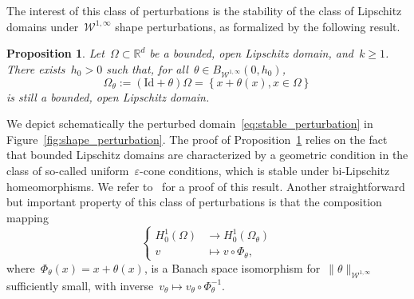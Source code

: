 \documentclass[a4]{article}
\newcommand{\R}{\mathbb{R}}
\newcommand{\1}{\mathbbm 1}
\newcommand{\Winf}{{{\cW}^{1,\infty}}}
\newcommand{\Id}{\mathrm{Id}}
\newcommand{\cW}{\mathcal{W}}
\newtheorem{proposition}{Proposition}
\begin{document}
        The interest of this class of perturbations is the stability of the class of Lipschitz domains under~$\Winf$ shape perturbations, as formalized by the following result.
        \begin{proposition}
            \label{prop:domain_stability}
            Let~$\Omega\subset \R^d$ be a bounded, open Lipschitz domain, and~$k\geq 1$. There exists~$h_0>0$ such that, for all~$\theta\in B_{\Winf}(0,h_0)$,
            \begin{equation}
                \label{eq:stable_perturbation}
                \Omega_\theta := (\Id+\theta)\Omega = \left\{x+\theta(x),x\in\Omega\right\}
            \end{equation}
            is still a bounded, open Lipschitz domain.
        \end{proposition}
        We depict schematically the perturbed domain~\eqref{eq:stable_perturbation} in Figure~\ref{fig:shape_perturbation}.
        The proof of Proposition~\ref{prop:domain_stability} relies on the fact that bounded Lipschitz domains are characterized by a geometric condition in the class of so-called uniform~$\varepsilon$-cone conditions, which is stable under bi-Lipschitz homeomorphisms. We refer to~\cite[Section III]{C75} for a proof of this result.
        Another straightforward but important property of this class of perturbations is that the composition mapping
        \begin{equation}
            \label{eq:composition}
            \left\{\begin{aligned}
                H_0^1(\Omega)&\to H_0^1(\Omega_\theta)\\
                v&\mapsto v\circ \Phi_\theta,
            \end{aligned}\right.
        \end{equation}
        where~$\Phi_\theta(x) = x + \theta(x)$, is a Banach space isomorphism for~$\|\theta\|_{\Winf}$ sufficiently small, with inverse~$v_\theta\mapsto v_\theta\circ \Phi_\theta^{-1}$.
\end{document}
